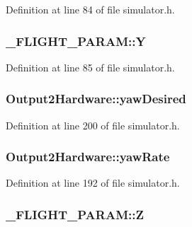 Definition at line 84 of file simulator.\-h.

\hypertarget{group___h_i_t_l_plugin_gafb4f835313c27ac7b01fe3eb77b6bacc}{
\subsubsection[{Y}]{ \-\_\-\-F\-L\-I\-G\-H\-T\-\_\-\-P\-A\-R\-A\-M\-::\-Y}}\label{group___h_i_t_l_plugin_gafb4f835313c27ac7b01fe3eb77b6bacc}


Definition at line 85 of file simulator.\-h.

\hypertarget{group___h_i_t_l_plugin_gaf01c33ffb5c7695348739d0070122bd7}{
\subsubsection[{yaw\-Desired}]{ Output2\-Hardware\-::yaw\-Desired}}\label{group___h_i_t_l_plugin_gaf01c33ffb5c7695348739d0070122bd7}


Definition at line 200 of file simulator.\-h.

\hypertarget{group___h_i_t_l_plugin_gab54300de73ca6f11f519068435673210}{
\subsubsection[{yaw\-Rate}]{ Output2\-Hardware\-::yaw\-Rate}}\label{group___h_i_t_l_plugin_gab54300de73ca6f11f519068435673210}


Definition at line 192 of file simulator.\-h.

\hypertarget{group___h_i_t_l_plugin_gacb21381efc860b328d0be136ef53f98c}{
\subsubsection[{Z}]{ \-\_\-\-F\-L\-I\-G\-H\-T\-\_\-\-P\-A\-R\-A\-M\-::\-Z}}\label{group___h_i_t_l_plugin_gacb21381efc860b328d0be136ef53f98c}


